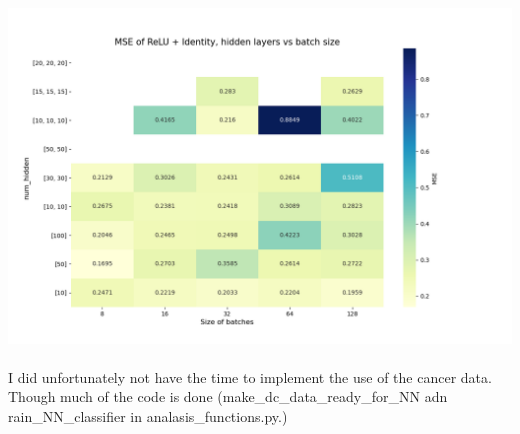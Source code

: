 \documentclass[12pt, letterpaper, twoside]{article}
\begin{document}
\includegraphics[scale=0.5]{"layer_v_batch_relu"}\\
\ \\
I did unfortunately not have the time to implement the use of the cancer data. Though much of the code is done (make\_dc\_data\_ready\_for\_NN adn rain\_NN\_classifier in analasis\_functions.py.)
\end{document}
